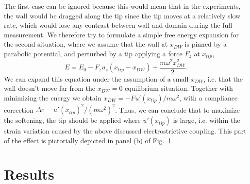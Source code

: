 The first case can be ignored because this would mean that in the experiments, the wall would be dragged along the tip since the tip moves at a relatively slow rate, which would lose any contrast between wall and domain during the full measurement. We therefore try to formulate a simple free energy expansion for the second situation, where we assume that the wall at $x_{DW}$ is pinned by a parabolic potential, and perturbed by a tip applying a force $F_z$ at $x_{tip}$,
\begin{equation}
	E = E_0 - F_z u_z (x_{tip} - x_{DW}) + \frac{m\omega^2 x_{DW}^2}{2}.
\end{equation}
We can expand this equation under the assumption of a small $x_{DW}$, i.e. that the wall doesn't move far from the $x_{DW}=0$ equilibrium situation. Together with minimizing the energy we obtain $x_{DW} = -F u'(x_{tip})/m \omega^2$, with a compliance correction $\Delta c = u'(x_{tip})^2/(m\omega^2)^2$. Thus, we can conclude that to maximize the softening, the tip should be applied where $u'(x_{tip})$ is large, i.e. within the strain variation caused by the above discussed electrostrictive coupling. This part of the effect is pictorially depicted in panel (b) of Fig.~\ref{fig:BTO_theory}.

\begin{figure}
	\caption{\label{fig:BTO_theory}}
\end{figure}

\section{Results}

\printbibliography
